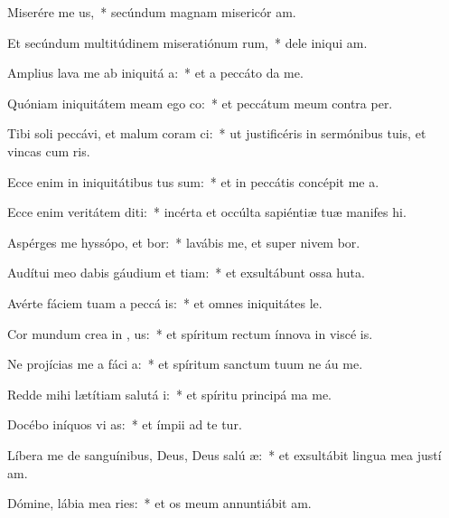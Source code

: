 \item Miserére me us,~* secúndum magnam misericór am.
\item Et secúndum multitúdinem miseratiónum rum,~* dele iniqui am.
\item Amplius lava me ab iniquitá a:~* et a peccáto  da me.
\item Quóniam iniquitátem meam ego co:~* et peccátum meum contra   per.
\item Tibi soli peccávi, et malum coram  ci:~* ut justificéris in sermónibus tuis, et vincas cum ris.
\item Ecce enim in iniquitátibus tus sum:~* et in peccátis concépit me  a.
\item Ecce enim veritátem diti:~* incérta et occúlta sapiéntiæ tuæ manifes hi.
\item Aspérges me hyssópo, et bor:~* lavábis me, et super nivem bor.
\item Audítui meo dabis gáudium et tiam:~* et exsultábunt ossa huta.
\item Avérte fáciem tuam a peccá is:~* et omnes iniquitátes  le.
\item Cor mundum crea in , us:~* et spíritum rectum ínnova in viscé is.
\item Ne projícias me a fáci a:~* et spíritum sanctum tuum ne áu  me.
\item Redde mihi lætítiam salutá i:~* et spíritu principá ma me.
\item Docébo iníquos vi as:~* et ímpii ad te tur.
\item Líbera me de sanguínibus, Deus, Deus salú æ:~* et exsultábit lingua mea justí am.
\item Dómine, lábia mea ries:~* et os meum annuntiábit  am.
